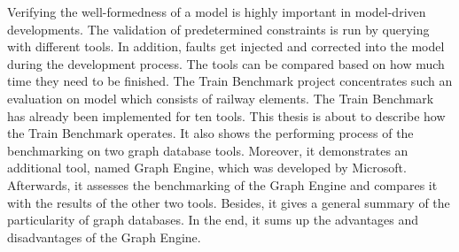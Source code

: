 Verifying the well-formedness of a model is highly important in model-driven developments. The validation of predetermined constraints is run by querying with different tools. In addition, faults get injected and corrected into the model during the development process. The tools can be compared based on how much time they need to be finished. The Train Benchmark project concentrates such an evaluation on model which consists of railway elements. The Train Benchmark has already been implemented for ten tools. This thesis is about to describe how the Train Benchmark operates. It also shows the performing process of the benchmarking on two graph database tools. Moreover, it demonstrates an additional tool, named Graph Engine, which was developed by Microsoft. Afterwards, it assesses the benchmarking of the Graph Engine and compares it with the results of the other two tools. Besides, it gives a general summary of the particularity of graph databases. In the end, it sums up the advantages and disadvantages of the Graph Engine.

\vfill
\selectthesislanguage

\setcounter{romanPage}{\value{page}}
